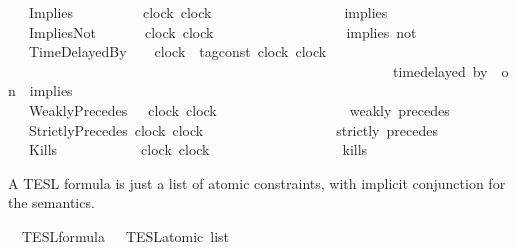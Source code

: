 \begin{isabellebody}
\ \ {\isacharbar}\ Implies\ \ \ \ \ \ \ \ \ \ {\isacartoucheopen}clock{\isacartoucheclose}\ {\isacartoucheopen}clock{\isacartoucheclose}\ \ \ \ \ \ \ \ \ \ \ \ \ \ \ \ \ \ {\isacharparenleft}\ {\isacartoucheopen}implies{\isacartoucheclose}\ {}{}{\isacharparenright}\isanewline
\ \ {\isacharbar}\ ImpliesNot\ \ \ \ \ \ \ {\isacartoucheopen}clock{\isacartoucheclose}\ {\isacartoucheopen}clock{\isacartoucheclose}\ \ \ \ \ \ \ \ \ \ \ \ \ \ \ \ \ \ {\isacharparenleft}\ {\isacartoucheopen}implies\ not{\isacartoucheclose}\ {}{}{\isacharparenright}\isanewline
\ \ {\isacharbar}\ TimeDelayedBy\ \ \ \ {\isacartoucheopen}clock{\isacartoucheclose}\ {\isacartoucheopen}{\isacharprime}{\isasymtau}\ tag{\isacharunderscore}const{\isacartoucheclose}\ {\isacartoucheopen}clock{\isacartoucheclose}\ {\isacartoucheopen}clock{\isacartoucheclose}\ \isanewline
\ \ \ \ \ \ \ \ \ \ \ \ \ \ \ \ \ \ \ \ \ \ \ \ \ \ \ \ \ \ \ \ \ \ \ \ \ \ \ \ \ \ \ \ \ \ \ \ \ \ \ \ \ \ {\isacharparenleft}{\isacartoucheopen}{\isacharunderscore}\ time{\isacharminus}delayed\ by\ {\isacharunderscore}\ on\ {\isacharunderscore}\ implies\ {\isacharunderscore}{\isacartoucheclose}\ {}{}{\isacharparenright}\isanewline
\ \ {\isacharbar}\ WeaklyPrecedes\ \ \ {\isacartoucheopen}clock{\isacartoucheclose}\ {\isacartoucheopen}clock{\isacartoucheclose}\ \ \ \ \ \ \ \ \ \ \ \ \ \ \ \ \ \ {\isacharparenleft}\ {\isacartoucheopen}weakly\ precedes{\isacartoucheclose}\ {}{}{\isacharparenright}\isanewline
\ \ {\isacharbar}\ StrictlyPrecedes\ {\isacartoucheopen}clock{\isacartoucheclose}\ {\isacartoucheopen}clock{\isacartoucheclose}\ \ \ \ \ \ \ \ \ \ \ \ \ \ \ \ \ \ {\isacharparenleft}\ {\isacartoucheopen}strictly\ precedes{\isacartoucheclose}\ {}{}{\isacharparenright}\isanewline
\ \ {\isacharbar}\ Kills\ \ \ \ \ \ \ \ \ \ \ \ {\isacartoucheopen}clock{\isacartoucheclose}\ {\isacartoucheopen}clock{\isacartoucheclose}\ \ \ \ \ \ \ \ \ \ \ \ \ \ \ \ \ \ {\isacharparenleft}\ {\isacartoucheopen}kills{\isacartoucheclose}\ {}{}{\isacharparenright}%
\begin{isamarkuptext}%
A TESL formula is just a list of atomic constraints, with implicit conjunction
  for the semantics.%
\end{isamarkuptext}\isamarkuptrue%
\isamarkupfalse%
\ {\isacharprime}{\isasymtau}\ TESL{\isacharunderscore}formula\ {\isacharequal}\ {\isacartoucheopen}{\isacharprime}{\isasymtau}\ TESL{\isacharunderscore}atomic\ list{\isacartoucheclose}%

\end{isabellebody}
